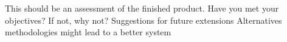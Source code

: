 This should be an assessment of the finished product. \linebreak[1]
Have you met your objectives? If not, why not? \linebreak[1]
Suggestions for future extensions \linebreak[1]
Alternatives methodologies might lead to a better system